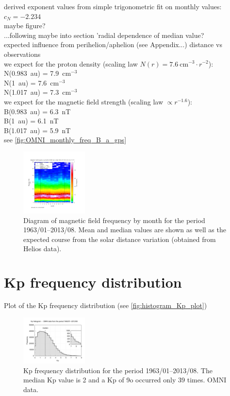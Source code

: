 derived exponent values from simple trigonometric fit on monthly values:\\
$c_N = -2.234$\\
maybe figure?\\

...following maybe into section 'radial dependence of median value?\\
expected influence from perihelion/aphelion (see Appendix...) distance vs observations\\
we expect for the proton density (scaling law $N(r) = 7.6~\text{cm}^{-3} \cdot r^{-2}$):\\
N(0.983~au) = 7.9~cm$^{-3}$\\
N(1~au) = 7.6~cm$^{-3}$\\
N(1.017~au) = 7.3~cm$^{-3}$\\
we expect for the magnetic field strength (scaling law $\propto r^{-1.6}$):\\
B(0.983~au) = 6.3~nT\\
B(1~au) = 6.1~nT\\
B(1.017~au) = 5.9~nT\\


see \autoref{fig:OMNI_monthly_freq_B_a_gps}
\begin{figure}[htb]
	\centering
	\includegraphics[width=0.3\textwidth]{images/gnuplots/OMNI_monthly_freq_B_a_gps.png}
	\caption{Diagram of magnetic field frequency by month for the period 1963/01--2013/08. Mean and median values are shown as well as the expected course from the solar distance variation (obtained from Helios data).}
	\label{fig:OMNI_monthly_freq_B_a_gps}
\end{figure}


\section{Kp frequency distribution}

Plot of the Kp frequency distribution (see \autoref{fig:histogram_Kp_plot})	%
\begin{figure}[htb]
	\centering
	\includegraphics[width=0.3\textwidth]{images/gnuplots/histogram_Kp_plot.pdf}
	\caption{Kp frequency distribution for the period 1963/01--2013/08. The median Kp value is 2 and a Kp of 9o occurred only 39 times. OMNI data.}
	\label{fig:histogram_Kp_plot}
\end{figure}


